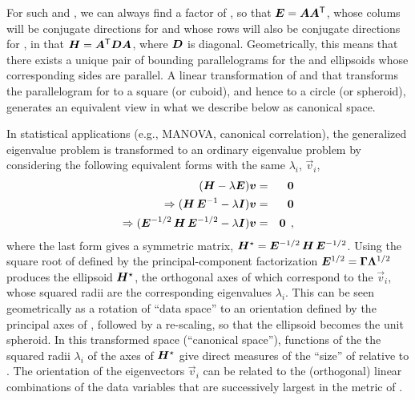 For such  and , we can always find a factor  of , so that
$\bm{E} = \bm{A} \bm{A}^\mathsf{T}$, whose colums will be conjugate directions for 
and whose rows will also be conjugate directions for , in that $\bm{H} = \bm{A}^\mathsf{T} \bm{D} \bm{A}$,
where $\bm{D}$ is diagonal.  Geometrically, this means that there exists a unique pair of
bounding parallelograms for the  and  ellipsoids whose
corresponding sides are parallel. A linear transformation of  and 
that transforms the parallelogram
for  to a square (or cuboid), and hence  to a circle (or spheroid), generates an
equivalent view in what we describe below as canonical space.


In statistical applications (e.g., MANOVA, canonical correlation), the generalized
eigenvalue problem is transformed to an ordinary eigenvalue problem by considering
the following equivalent forms with the same $\lambda_i$, $\vec{v}_i$,
\begin{eqnarray*}
(\bm{H} - \lambda \bm{E}) \bm{v} & = & \bm{0} \\
\Rightarrow (\bm{H} \, \bm{\bm{E}}^{-1} - \lambda \bm{I}) \bm{v} & = & \bm{0} \\
\Rightarrow (\bm{\bm{E}}^{-1/2} \, \bm{H} \, \bm{\bm{E}}^{-1/2} - \lambda \bm{I}) \bm{v} & = & \bm{0} \:\: ,
\end{eqnarray*}
where the last form gives a symmetric matrix, $\bm{H}^\star = \bm{E}^{-1/2} \, \bm{H} \, \bm{E}^{-1/2}$.
Using the square root of  defined by the
principal-component factorization $\bm{E}^{1/2} = \bm{\Gamma} \bm{\bm{\Lambda}}^{1/2}$ produces
the ellipsoid  $\bm{H}^\star$, the
orthogonal axes of which correspond to the $\vec{v}_i$, whose squared radii are the corresponding %
eigenvalues $\lambda_i$.  This can be seen geometrically as a rotation of ``data space''
to an orientation defined by the principal axes of , followed by a re-scaling, so
that the  ellipsoid becomes the unit spheroid.  In this transformed space
(``canonical space''), functions of the
the squared radii $\lambda_i$ of the axes of $\bm{H}^\star$ give direct measures of %
the ``size'' of  relative to . The orientation of the eigenvectors
$\vec{v}_i$ can be related to the (orthogonal) linear combinations of the
data variables that are successively largest in the metric of .


